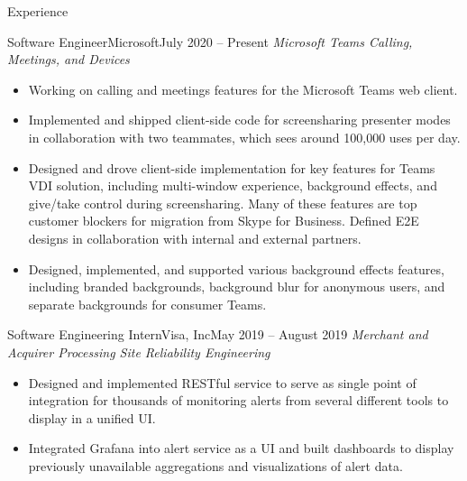 \documentclass[]{mcdowellcv}
\begin{document}
	\makeheader
	
	
	\begin{cvsection}{Experience}
	
		\begin{cvsubsection}{Software Engineer}{Microsoft}{July 2020 -- Present}
			\emph{Microsoft Teams Calling, Meetings, and Devices}
			\begin{itemize}
				\item Working on calling and meetings features for the Microsoft Teams web client.
				\item Implemented and shipped client-side code for screensharing presenter modes in collaboration with two teammates, which sees around 100,000 uses per day.
				\item Designed and drove client-side implementation for key features for Teams VDI solution, including multi-window experience, background effects, and give/take control during screensharing. Many of these features are top customer blockers for migration from Skype for Business. Defined E2E designs in collaboration with internal and external partners.
				\item Designed, implemented, and supported various background effects features, including branded backgrounds, background blur for anonymous users, and separate backgrounds for consumer Teams.
			\end{itemize}
		\end{cvsubsection}
		
		\begin{cvsubsection}{Software Engineering Intern}{Visa, Inc}{May 2019 -- August 2019}
		\emph{Merchant and Acquirer Processing Site Reliability Engineering	}
			\begin{itemize}
				\item Designed and implemented RESTful service to serve as single point of integration for thousands of monitoring alerts from several different tools to display in a unified UI.
				\item Integrated Grafana into alert service as a UI and built dashboards to display previously unavailable aggregations and visualizations of alert data.			
			\end{itemize}
		\end{cvsubsection}
						

\end{cvsection}
\end{document}
